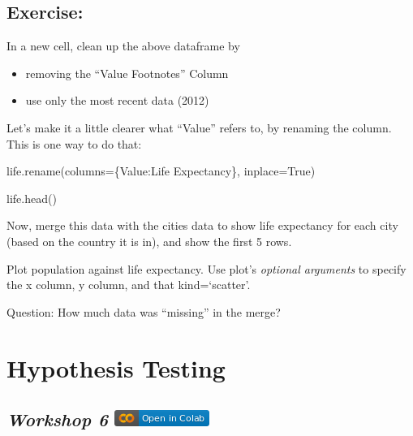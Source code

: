 \documentclass[
  letterpaper,
  DIV=11,
  numbers=noendperiod]{scrreprt}
\newenvironment{Shaded}{\begin{snugshade}}{\end{snugshade}}
\newcommand{\NormalTok}[1]{\textcolor[rgb]{0.00,0.23,0.31}{#1}}
\newcommand{\OperatorTok}[1]{\textcolor[rgb]{0.37,0.37,0.37}{#1}}
\newcommand{\StringTok}[1]{\textcolor[rgb]{0.13,0.47,0.30}{#1}}
\newcommand{\VariableTok}[1]{\textcolor[rgb]{0.07,0.07,0.07}{#1}}
\providecommand{\tightlist}{%
  \setlength{\itemsep}{0pt}\setlength{\parskip}{0pt}}\usepackage{longtable,booktabs,array}
\begin{document}
\hypertarget{exercise-20}{%
\section{Exercise:}\label{exercise-20}}

In a new cell, clean up the above dataframe by

\begin{itemize}
\tightlist
\item
  removing the ``Value Footnotes'' Column
\item
  use only the most recent data (2012)
\end{itemize}

Let's make it a little clearer what ``Value'' refers to, by renaming the
column. This is one way to do that:

\begin{Shaded}
\begin{Highlighting}[]
\NormalTok{life.rename(columns}\OperatorTok{=}\NormalTok{\{}\StringTok{\textquotesingle{}Value\textquotesingle{}}\NormalTok{:}\StringTok{\textquotesingle{}Life Expectancy\textquotesingle{}}\NormalTok{\}, inplace}\OperatorTok{=}\VariableTok{True}\NormalTok{)}
\end{Highlighting}
\end{Shaded}

\begin{Shaded}
\begin{Highlighting}[]
\NormalTok{life.head()}
\end{Highlighting}
\end{Shaded}

Now, merge this data with the cities data to show life expectancy for
each city (based on the country it is in), and show the first 5 rows.

Plot population against life expectancy. Use plot's \emph{optional
arguments} to specify the x column, y column, and that kind=`scatter'.

Question: How much data was ``missing'' in the merge?


\hypertarget{hypothesis-testing}{%
\chapter{Hypothesis Testing}\label{hypothesis-testing}}

\hypertarget{workshop-6-open-in-colab}{%
\section[\emph{Workshop 6} ]{\texorpdfstring{\emph{Workshop 6}
\href{https://colab.research.google.com/github/oballinger/QM2/blob/main/notebooks/W06.\%20Hypothesis\%20Testing.ipynb}{\protect\includegraphics{index_files/mediabag/colab-badge.png}}}{Workshop 6 Open In Colab}}\label{workshop-6-open-in-colab}}
\end{document}
